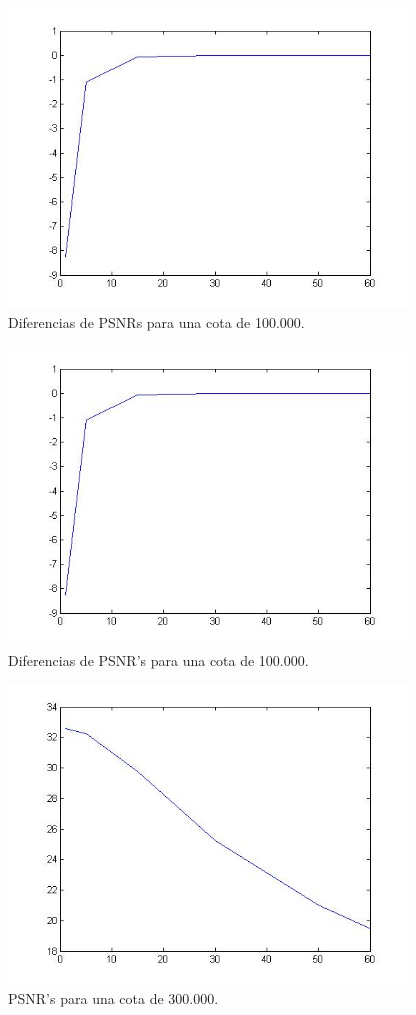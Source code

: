 \documentclass[10pt, a4paper]{article}
\begin{document}
\begin{itemize}
\begin{figure}[H] 
\begin{center}
\includegraphics[width=300pt]{./img3PXY100k.jpg}
\caption[h]{Diferencias de PSNRs para una cota de 100.000.}
\end{center}
\end{figure}

\begin{figure}[H]
\begin{center}
\includegraphics[width=300pt]{./img3PXY100k.jpg}
\caption[h]{Diferencias de PSNR's para una cota de 100.000.}
\end{center}
\end{figure}


\begin{figure}[H] 
\begin{center}
\includegraphics[width=300pt]{./img3PX300k.jpg}
\caption[h]{PSNR's para una cota de 300.000.}
\end{center}
\end{figure}



\end{itemize}
\end{document}
